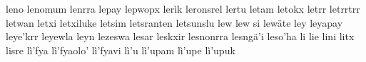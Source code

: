 leno\hspace{2mm}
lenomum\hspace{2mm}
lenrra\hspace{2mm}
lepay\hspace{2mm}
lepwopx\hspace{2mm}
lerìk\hspace{2mm}
leronsrel\hspace{2mm}
lertu\hspace{2mm}
letam\hspace{2mm}
letokx\hspace{2mm}
letrr\hspace{2mm}
letrrtrr\hspace{2mm}
letwan\hspace{2mm}
letxi\hspace{2mm}
letxiluke\hspace{2mm}
letsim\hspace{2mm}
letsranten\hspace{2mm}
letsunslu\hspace{2mm}
lew\hspace{2mm}
lew si\hspace{2mm}
lewäte\hspace{2mm}
ley\hspace{2mm}
leyapay\hspace{2mm}
leye'krr\hspace{2mm}
leyewla\hspace{2mm}
leyn\hspace{2mm}
lezeswa\hspace{2mm}
lesar\hspace{2mm}
leskxir\hspace{2mm}
lesnonrra\hspace{2mm}
lesngä'i\hspace{2mm}
leso'ha\hspace{2mm}
li\hspace{2mm}
lie\hspace{2mm}
lini\hspace{2mm}
litx\hspace{2mm}
lisre\hspace{2mm}
lì'fya\hspace{2mm}
lì'fyaolo'\hspace{2mm}
lì'fyavi\hspace{2mm}
lì'u\hspace{2mm}
lì'upam\hspace{2mm}
lì'upe\hspace{2mm}
lì'upuk\hspace{2mm}
